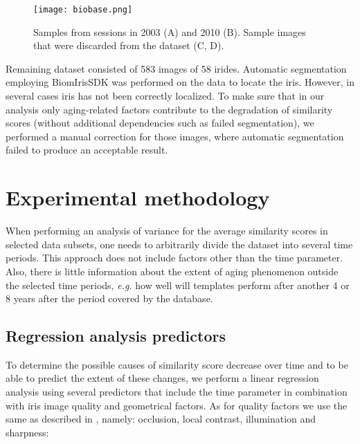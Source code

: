 \documentclass{article}
\begin{document}
\begin{figure}[!t]
\centering
\texttt{[image: biobase.png]}
\caption{Samples from sessions in 2003 (A) and 2010 (B). Sample images that were discarded from the dataset (C, D).}
\label{biobase}
\end{figure}

Remaining dataset consisted of 583 images of 58 irides. Automatic segmentation employing BiomIrisSDK \cite{BiomIrisSDK} was performed on the data to locate the iris. However, in several cases iris has not been correctly localized. To make sure that in our analysis only aging-related factors contribute to the degradation of similarity scores (without additional dependencies such as failed segmentation), we performed a manual correction for those images, where automatic segmentation failed to produce an acceptable result.

\section{Experimental methodology}
\label{sec:methodology}

When performing an analysis of variance for the average similarity scores in selected data subsets, one needs to arbitrarily divide the dataset into several time periods. This approach does not include factors other than the time parameter. Also, there is little information about the extent of aging phenomenon outside the selected time periods, \emph{e.g.} how well will templates perform after another 4 or 8 years after the period covered by the database.

\subsection{Regression analysis predictors}

To determine the possible causes of similarity score decrease over time and to be able to predict the extent of these changes, we perform a linear regression analysis using several predictors that include the time parameter in combination with iris image quality and geometrical factors. As for quality factors we use the same as described in \cite{Sazonova}, namely: occlusion, local contrast, illumination and sharpness:
\end{document}
